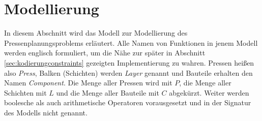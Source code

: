\section{Modellierung}
\label{sec:modellierung}
In diesem Abschnitt wird das Modell zur Modellierung des Pressenplanungsproblems erläutert.
Alle Namen von Funktionen in jenem Modell werden englisch formuliert, um die Nähe zur später in Abschnitt \ref{sec:kodierungconstraints} gezeigten Implementierung zu wahren.
Pressen heißen also \textit{Press}, Balken (Schichten) werden \textit{Layer} genannt und Bauteile erhalten den Namen \textit{Component}.
Die Menge aller Pressen wird mit $P$, die Menge aller Schichten mit $L$ und die Menge aller Bauteile mit $C$ abgekürzt.
Weiter werden boolesche als auch arithmetische Operatoren vorausgesetzt und in der Signatur des Modells nicht genannt.

